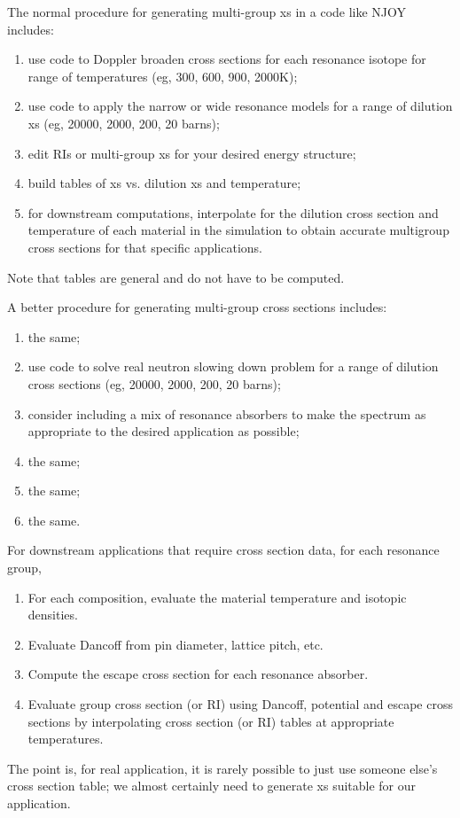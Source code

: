 \documentclass{school-22.211-notes}
\begin{document}
\clearpage
{}
The normal procedure for generating multi-group xs in a code like NJOY includes:
\begin{enumerate}
\item use code to Doppler broaden cross sections for each resonance isotope for range of temperatures (eg, 300, 600, 900, 2000K); 
\item use code to apply the narrow or wide resonance models for a range of dilution xs (eg, 20000, 2000, 200, 20 barns); 
\item edit RIs or multi-group xs for your desired energy structure; 
\item build tables of xs vs. dilution xs and temperature;
\item for downstream computations, interpolate for the dilution cross section and temperature of each material in the simulation to obtain accurate multigroup cross sections for that specific applications. 
\end{enumerate}
Note that tables are general and do not have to be computed. 

A better procedure for generating multi-group cross sections includes:
\begin{enumerate}
\item the same;
\item use code to solve real neutron slowing down problem for a range of dilution cross sections (eg, 20000, 2000, 200, 20 barns);
\item consider including a mix of resonance absorbers to make the spectrum as appropriate to the desired application as possible;
\item the same;
\item the same;
\item the same.
\end{enumerate}

For downstream applications that require cross section data, for each resonance group,
\begin{enumerate}
\item For each composition, evaluate the material temperature and isotopic densities. 
\item Evaluate Dancoff from pin diameter, lattice pitch, etc. 
\item Compute the escape cross section for each resonance absorber.
\item Evaluate group cross section (or RI) using Dancoff, potential and escape cross sections by interpolating cross section (or RI) tables at appropriate temperatures. 
\end{enumerate}
The point is, for real application, it is rarely possible to just use someone else's cross section table; we almost certainly need to generate xs suitable for our application. 
\end{document}
